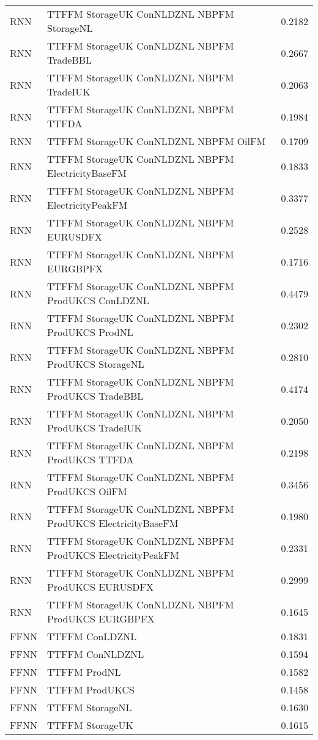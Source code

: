 \begin{table}[h!]
\begin{adjustbox}{max width=\textwidth}
\begin{tabular}{llr}
  RNN & TTFFM StorageUK ConNLDZNL NBPFM StorageNL & 0.2182 \\ 
  RNN & TTFFM StorageUK ConNLDZNL NBPFM TradeBBL & 0.2667 \\ 
  RNN & TTFFM StorageUK ConNLDZNL NBPFM TradeIUK & 0.2063 \\ 
  RNN & TTFFM StorageUK ConNLDZNL NBPFM TTFDA & 0.1984 \\ 
  RNN & TTFFM StorageUK ConNLDZNL NBPFM OilFM & 0.1709 \\ 
  RNN & TTFFM StorageUK ConNLDZNL NBPFM ElectricityBaseFM & 0.1833 \\ 
  RNN & TTFFM StorageUK ConNLDZNL NBPFM ElectricityPeakFM & 0.3377 \\ 
  RNN & TTFFM StorageUK ConNLDZNL NBPFM EURUSDFX & 0.2528 \\ 
  RNN & TTFFM StorageUK ConNLDZNL NBPFM EURGBPFX & 0.1716 \\ 
  RNN & TTFFM StorageUK ConNLDZNL NBPFM ProdUKCS ConLDZNL & 0.4479 \\ 
  RNN & TTFFM StorageUK ConNLDZNL NBPFM ProdUKCS ProdNL & 0.2302 \\ 
  RNN & TTFFM StorageUK ConNLDZNL NBPFM ProdUKCS StorageNL & 0.2810 \\ 
  RNN & TTFFM StorageUK ConNLDZNL NBPFM ProdUKCS TradeBBL & 0.4174 \\ 
  RNN & TTFFM StorageUK ConNLDZNL NBPFM ProdUKCS TradeIUK & 0.2050 \\ 
  RNN & TTFFM StorageUK ConNLDZNL NBPFM ProdUKCS TTFDA & 0.2198 \\ 
  RNN & TTFFM StorageUK ConNLDZNL NBPFM ProdUKCS OilFM & 0.3456 \\ 
  RNN & TTFFM StorageUK ConNLDZNL NBPFM ProdUKCS ElectricityBaseFM & 0.1980 \\ 
  RNN & TTFFM StorageUK ConNLDZNL NBPFM ProdUKCS ElectricityPeakFM & 0.2331 \\ 
  RNN & TTFFM StorageUK ConNLDZNL NBPFM ProdUKCS EURUSDFX & 0.2999 \\ 
  RNN & TTFFM StorageUK ConNLDZNL NBPFM ProdUKCS EURGBPFX & 0.1645 \\ 
  FFNN & TTFFM ConLDZNL & 0.1831 \\ 
  FFNN & TTFFM ConNLDZNL & 0.1594 \\ 
  FFNN & TTFFM ProdNL & 0.1582 \\ 
  FFNN & TTFFM ProdUKCS & 0.1458 \\ 
  FFNN & TTFFM StorageNL & 0.1630 \\ 
  FFNN & TTFFM StorageUK & 0.1615 \\ 

\end{tabular}
\end{adjustbox}
\end{table}
